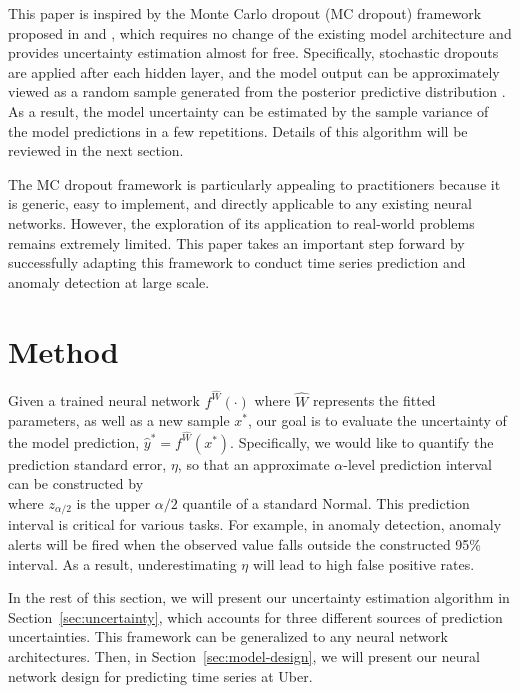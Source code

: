 \documentclass[conference,compsoc,final]{IEEEtran}
\begin{document}
This paper is inspired by the Monte Carlo dropout (MC dropout) framework proposed in \cite{gal2016dropout} and \cite{Gal2015Theoretically}, which requires no change of the existing model architecture and provides uncertainty estimation almost for free. Specifically, stochastic dropouts are applied after each hidden layer, and the model output can be approximately viewed as a random sample generated from the posterior predictive distribution \cite{gal2016uncertainty}. As a result, the model uncertainty can be estimated by the sample variance of the model predictions in a few repetitions. Details of this algorithm will be reviewed in the next section. 

The MC dropout framework is particularly appealing to practitioners because it is generic, easy to implement, and directly applicable to any existing neural networks.  
However, the exploration of its application to real-world problems remains extremely limited. This paper takes an important step forward by successfully adapting this framework to conduct time series prediction and anomaly detection at large scale.


 

\section{Method}
\label{sec:method}

Given a trained neural network $f^{\hat{W}}(\cdot)$ where $\hat{W}$ represents the fitted parameters, as well as a new sample $x^*$, our goal is to evaluate the uncertainty of the model prediction, $\hat{y}^* = f^{\hat{W}}(x^*)$. Specifically, we would like to quantify the prediction standard error, $\eta$, so that an approximate $\alpha$-level prediction interval can be constructed by 
\begin{equation}
[\hat{y}^* - z_{\alpha/2} \eta, ~ \hat{y}^* + z_{\alpha/2} \eta]
\end{equation}
where $z_{\alpha/2}$ is the upper $\alpha/2$ quantile of a standard Normal. This prediction interval is critical for various tasks. For example, in anomaly detection, anomaly alerts will be fired when the observed value falls outside the constructed 95\% interval. As a result, underestimating $\eta$ will lead to high false positive rates.

In the rest of this section, we will present our uncertainty estimation algorithm in Section~\ref{sec:uncertainty}, which accounts for three different sources of prediction uncertainties. This framework can be generalized to any neural network architectures. Then, in Section~\ref{sec:model-design}, we will present our neural network design for predicting time series at Uber.
\end{document}
